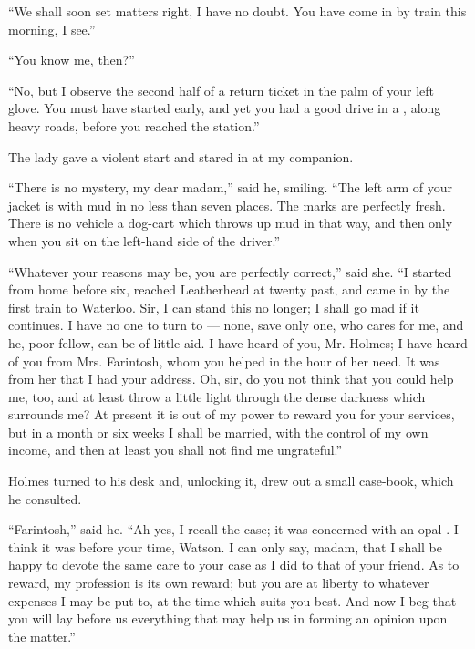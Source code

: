 \documentclass{fiche}
\begin{document}
\begin{texte}
``We shall soon set matters right, I have no doubt. You have come in by train this morning, I
see.''

``You know me, then?''

``No, but I observe the second half of a return ticket in the palm of your left glove. You
must have started early, and yet you had a good drive in a
, along heavy roads, before you reached the
station.''

The lady gave a violent start and stared in 
at my companion.

``There is no mystery, my dear madam,'' said he, smiling. ``The left arm of your jacket is
 with mud in no less than seven places. The marks are
perfectly fresh. There is no vehicle  a dog-cart which throws
up mud in that way, and then only when you sit on the left-hand side of the driver.''

``Whatever your reasons may be, you are perfectly correct,'' said she. ``I started from home
before six, reached Leatherhead at twenty past, and came in by the first train to Waterloo.
Sir, I can stand this  no longer; I shall go mad
if it continues. I have no one to turn to --- none, save only one, who cares for me, and he,
poor fellow, can be of little aid. I have heard of you, Mr. Holmes; I have heard of you from
Mrs. Farintosh, whom you helped in the hour of her  need. It
was from her that I had your address. Oh, sir, do you not think that you could help me, too,
and at least throw a little light through the dense darkness which surrounds me? At present
it is out of my power to reward you for your services, but in a month or six weeks I shall be
married, with the control of my own income, and then at least you shall not find me
ungrateful.''

Holmes turned to his desk and, unlocking it, drew out a small case-book, which he consulted.

``Farintosh,'' said he. ``Ah yes, I recall the case; it was concerned with an opal
. I think it was before your time, Watson. I can only say,
madam, that I shall be happy to devote the same care to your case as I did to that of your
friend. As to reward, my profession is its own reward; but you are at liberty to
 whatever expenses I may be put to, at the time
which suits you best. And now I beg that you will lay before us everything that may help us
in forming an opinion upon the matter.''


\end{texte}
\end{document}
